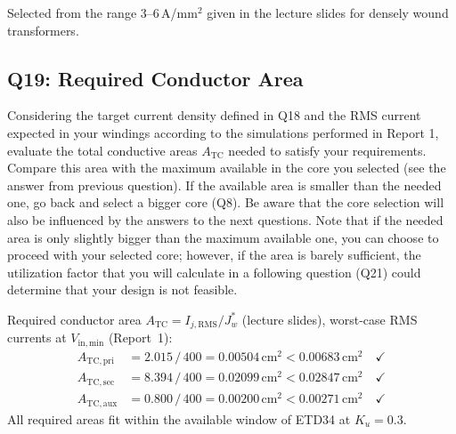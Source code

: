 \documentclass{PELsmallreport}
\begin{document}
 \hfill{}

\noindent Selected from the range 3--6\,A/mm$^2$ given in the lecture slides for densely wound transformers.




\subsection{Q19: Required Conductor Area} 
Considering the target current density defined in Q18 and the RMS current expected in your windings according to the simulations performed in Report 1, evaluate the total conductive areas $A_\mathrm{TC}$ needed to satisfy your requirements. 
Compare this area with the maximum available in the core you selected (see the answer from previous question). 
If the available area is smaller than the needed one, go back and select a bigger core (Q8). 
Be aware that the core selection will also be influenced by the answers to the next questions.  
Note that if the needed area is only slightly bigger than the maximum available one, you can choose to proceed with your selected core; however, if the area is barely sufficient, the utilization factor that you will calculate in a following question (Q21) could determine that your design is not feasible.  
\\

\begin{framed}
Required conductor area $A_\mathrm{TC} = I_{j,\mathrm{RMS}}/J_w^*$ (lecture slides), worst-case RMS currents at $V_\mathrm{in,min}$ (Report~1):
\begin{align}
    A_\mathrm{TC,pri} &= 2.015\,/\,400 = 0.00504\,\mathrm{cm}^2 < 0.00683\,\mathrm{cm}^2 \quad\checkmark\\
    A_\mathrm{TC,sec} &= 8.394\,/\,400 = 0.02099\,\mathrm{cm}^2 < 0.02847\,\mathrm{cm}^2 \quad\checkmark\\
    A_\mathrm{TC,aux} &= 0.800\,/\,400 = 0.00200\,\mathrm{cm}^2 < 0.00271\,\mathrm{cm}^2 \quad\checkmark
\end{align}
All required areas fit within the available window of ETD34 at $K_u=0.3$.
\end{framed}

 \quad {} \quad {} \hfill{}
\end{document}
